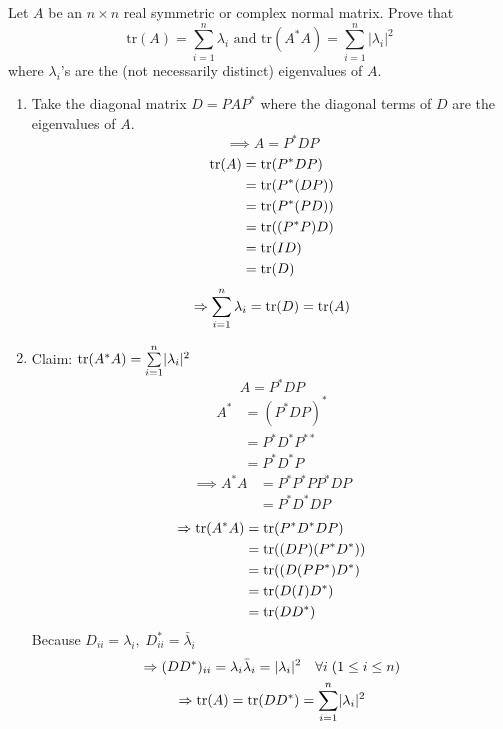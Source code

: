 Let $A$ be an $n \times n$ real symmetric or complex normal
matrix. Prove that
\[
\text{tr}(A) = \sum\limits_{i=1}^n \lambda_i \text{ and }
\text{tr}(A^*A) = \sum\limits_{i=1}^n\lvert \lambda_i \rvert^2
\]
where $\lambda_i$'s are the (not necessarily distinct) eigenvalues of $A.$
\begin{enumerate}
\item Take the diagonal matrix $D = PAP^*$ where the diagonal terms of
  $D$ are the eigenvalues of $A.$
\begin{equation}
\implies A = P^*DP
\end{equation}
\begin{align}
\text{tr}({A}) &= \text{tr}({P^*DP})\\
&=\text{tr}({P^*(DP)})\\
&=\text{tr}({P^*(PD)})\\
&=\text{tr}({(P^*P)D})\\
&=\text{tr}({ID})\\
&=\text{tr}({D})
\end{align}
\begin{equation}
\Rightarrow \sum\limits_{i=1}^n \lambda_i = \text{tr}({D}) = \text{tr}({A})
\end{equation}
\item Claim: $\text{tr}({A^*A}) = \sum\limits_{i=1}^n\lvert \lambda_i\rvert^2$
\begin{equation}
A = P^*DP
\end{equation}
\begin{align}
A^* &= (P^*DP)^*\\
&=P^*D^*P^{**}\\
&= P^*D^*P
\end{align}
\begin{align}
\implies A^*A &= P^*P^*PP^*DP\\
&= P^*D^*DP
\end{align}
\begin{align}
\Rightarrow \text{tr}({A^*A}) &= \text{tr}({P^*D^*DP})\\
&= \text{tr}({(DP)(P^*D^*)})\\
&= \text{tr}({(D(PP^*)D^*})\\
&= \text{tr}({D(I)D^*})\\
&= \text{tr}({DD^*})
\end{align}
Because $D_{ii} = \lambda_i,\; D_{ii}^* = \bar{\lambda}_i$
\begin{gather}
\Rightarrow (DD^*)_{ii} = \lambda_i\bar{\lambda}_i = \lvert
\lambda_i\rvert^2\quad \forall i\; (1\leq i \leq n)\\
\Rightarrow \text{tr}({A}) = \text{tr}({DD^*}) = \sum\limits_{i=1}^n\lvert \lambda_i\rvert^2
\end{gather}
\end{enumerate}
